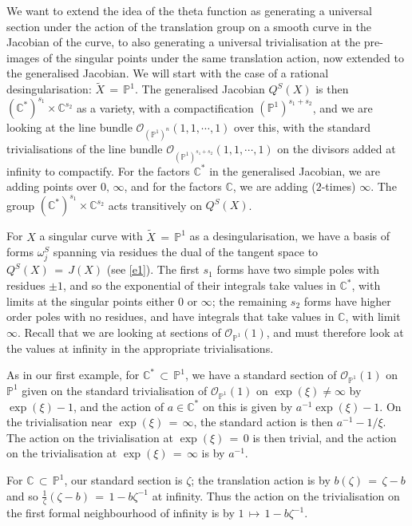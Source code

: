 \documentclass[12pt,reqno]{amsart}
\numberwithin{equation}{section}
\theoremstyle{definition}
\theoremstyle{remark}
\def\bC{{\mathbb {C}}}
\def\bP{{\mathbb {P}}}
\def\pO{{\mathcal O}}
\begin{document}
We want to extend the idea of the theta function as generating a universal section under the action of the 
translation group on a smooth curve in the Jacobian of the curve, to also generating a universal 
trivialisation at the pre-images of the singular points under the same translation action, now extended to 
the generalised Jacobian. We will start with the case of a rational desingularisation: $\widetilde X \,=
\, \bP^1$. 
The generalised Jacobian $Q^S(X)$ is then $(\bC^*)^{s_1} \times \bC^{s_2}$ as a variety, with a compactification 
$(\bP^1)^{s_1+s_2}$, and we are looking at the line bundle $\pO_{(\bP^1)^n}(1,1,\cdots ,1)$ over this, with the standard  trivialisations of the 
line bundle ${\pO}_{(\bP^1)^{s_1+s_2}}(1,1,\cdots ,1)$ on the divisors added at infinity to compactify. For the
factors $\bC^*$ in 
the generalised Jacobian, we are adding points over $0,\,\infty$, and for the factors $\bC$, we are 
adding ($2$-times) $\infty$. The group $(\bC^*)^{s_1} \times \bC^{s_2}$ acts transitively on $Q^S(X)$.

For $ X$ a singular curve with $\widetilde{X} \,=\, \bP^1$ as a desingularisation, we have a basis of forms 
$\omega_j^S$ spanning via residues the dual of the tangent space to $Q^S(X)\,=\, J(X)$
(see \eqref{e1}). The first $s_1$ 
forms have two simple poles with residues $\pm 1$, and so the exponential of their integrals take values in 
$\bC^*$, with limits at the singular points either $0$ or $\infty$; the remaining $s_2$ forms have higher order poles with no residues, and 
  have integrals that take values in $\bC$, with limit $\infty$. Recall that we are 
looking at sections of $\pO_{\bP^1}(1)$, and must therefore look at the values at infinity in the appropriate 
trivialisations.

As in our first example, for $\bC^*\,\subset\, \bP^1$, we have a standard section of $\pO_{\bP^1}(1)$ on $\bP^1$ given on the 
standard trivialisation of $\pO_{\bP^1}(1)$ on $\exp(\xi)\neq\infty$ by $\exp(\xi) -1$, and the action of $a\in \bC^*$ on this is
given by 
$ a^{-1}\exp(\xi) - 1$. On the trivialisation near $\exp(\xi)\, =\, \infty$, the standard action is then 
$a^{-1} - 1/\xi$. The action on the trivialisation at $\exp(\xi)\, =\, 0$ is then trivial, and the action on the 
trivialisation at $\exp(\xi)\, =\, \infty$ is by $a^{-1}$.

For $\bC\,\subset\, \bP^1$, our standard section is $\zeta$; the translation action is by $b(\zeta) \,=\, \zeta -b$ and so $ 
\frac{1}{\zeta} (\zeta -b)\, =\, 1-b\zeta^{-1}$ at infinity. Thus the action on the trivialisation on the first formal 
neighbourhood of infinity is by $1\,\longmapsto\, 1-b\zeta^{-1}$.
\end{document}
